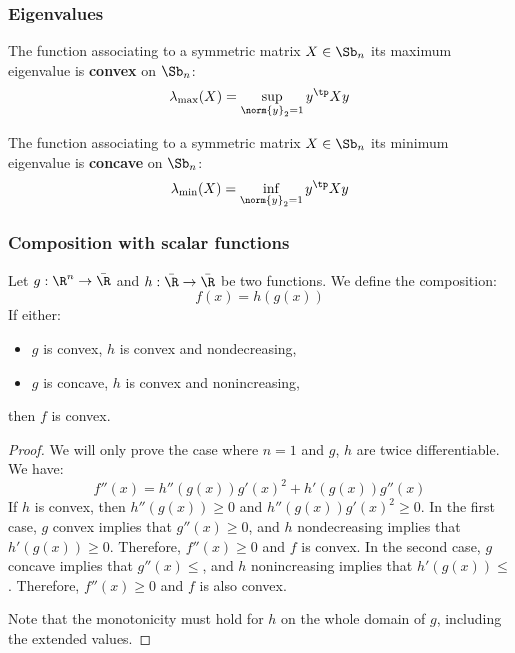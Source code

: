 \subsubsection{Eigenvalues}
\begin{property}
    The function associating to a symmetric matrix $X\in\Sb_n$ its maximum eigenvalue is \textbf{convex} on $\Sb_n$:
    \begin{equation*}
        \lambda_{\max}(X) = \sup_{\norm{y}_2=1} y^\tp Xy
    \end{equation*}
\end{property}

\begin{property}
    The function associating to a symmetric matrix $X\in\Sb_n$ its minimum eigenvalue is \textbf{concave} on $\Sb_n$:
    \begin{equation*}
        \lambda_{\min}(X) = \inf_{\norm{y}_2=1} y^\tp Xy
    \end{equation*}
\end{property}

\subsubsection{Composition with scalar functions}
\begin{property}
    \label{prop:composition-scalar}
    Let $g:\R^n\to\bar{\R}$ and $h:\bar{\R}\to\bar{\R}$ be two functions. We define the composition:
    \begin{equation*}
        f(x) = h(g(x))
    \end{equation*}
    If either:
    \begin{itemize}
        \item $g$ is convex, $h$ is convex and nondecreasing,
        \item $g$ is concave, $h$ is convex and nonincreasing,
    \end{itemize}
    then $f$ is convex.
\end{property}
\begin{proof}
    We will only prove the case where $n=1$ and $g$, $h$ are twice differentiable. We have:
    \begin{equation*}
        f''(x) = h''(g(x))g'(x)^2 + h'(g(x))g''(x)
    \end{equation*}
    If $h$ is convex, then $h''(g(x))\geq0$ and $h''(g(x))g'(x)^2\geq0$. In the first case, $g$ convex implies that $g''(x)\geq0$, and $h$ nondecreasing implies that $h'(g(x))\geq0$. Therefore, $f''(x)\geq0$ and $f$ is convex. In the second case, $g$ concave implies that $g''(x)\leq$, and $h$ nonincreasing implies that $h'(g(x))\leq$. Therefore, $f''(x)\geq0$ and $f$ is also convex.

    Note that the monotonicity must hold for $h$ on the whole domain of $g$, including the extended values.
\end{proof}

